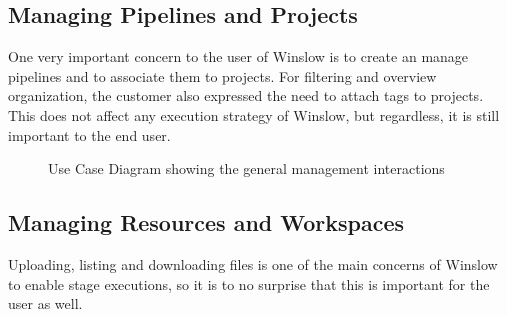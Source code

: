 \subsection{Managing Pipelines and Projects}

One very important concern to the user of Winslow is to create an manage pipelines and to associate them to projects.
For filtering and overview organization, the customer also expressed the need to attach tags to projects.
This does not affect any execution strategy of Winslow, but regardless, it is still important to the end user.


\begin{figure}[H]
	\centering
	\caption{Use Case Diagram showing the general management interactions}
	\label{use_case:mgmt}
\end{figure}


\subsection{Managing Resources and Workspaces}

Uploading, listing and downloading files is one of the main concerns of Winslow to enable stage executions, so it is to no surprise that this is important for the user as well.

